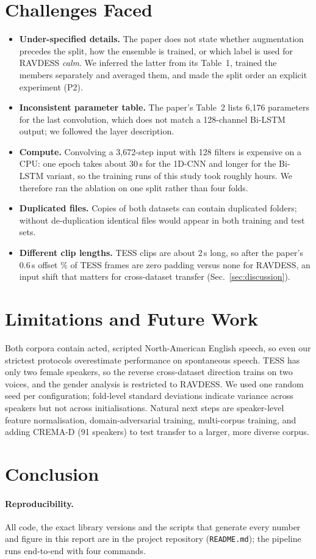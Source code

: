 \section{Challenges Faced}
\begin{itemize}
  \item \textbf{Under-specified details.} The paper does not state whether augmentation precedes the split, how
        the ensemble is trained, or which label is used for RAVDESS \emph{calm}. We inferred the latter from its
        Table~1, trained the members separately and averaged them, and made the split order an explicit experiment (P2).
  \item \textbf{Inconsistent parameter table.} The paper's Table~2 lists 6,176 parameters for the last
        convolution, which does not match a 128-channel Bi-LSTM output; we followed the layer description.
  \item \textbf{Compute.} Convolving a 3,672-step input with 128 filters is expensive on a CPU: one epoch takes
        about 30\,s for the 1D-CNN and longer for the Bi-LSTM variant, so the \NumTrainings{} training runs of this
        study took roughly \ComputeHours{} hours. We therefore ran the ablation on one split rather than four folds.
  \item \textbf{Duplicated files.} Copies of both datasets can contain duplicated folders; without
        de-duplication identical files would appear in both training and test sets.
  \item \textbf{Different clip lengths.} TESS clips are about 2\,s long, so after the paper's 0.6\,s offset
        \TessPadPct\% of TESS frames are zero padding versus none for RAVDESS, an input shift that matters for
        cross-dataset transfer (Sec.~\ref{sec:discussion}).
\end{itemize}

\section{Limitations and Future Work}
Both corpora contain acted, scripted North-American English speech, so even our strictest protocols overestimate
performance on spontaneous speech. TESS has only two female speakers, so the reverse cross-dataset direction trains
on two voices, and the gender analysis is restricted to RAVDESS. We used one random seed per configuration; fold-level
standard deviations indicate variance across speakers but not across initialisations. Natural next steps are
speaker-level feature normalisation, domain-adversarial training, multi-corpus training, and adding CREMA-D
(91 speakers) to test transfer to a larger, more diverse corpus.

\section{Conclusion}


\paragraph{Reproducibility.} All code, the exact library versions and the scripts that generate every number and
figure in this report are in the project repository (\texttt{README.md}); the pipeline runs end-to-end with four
commands.
